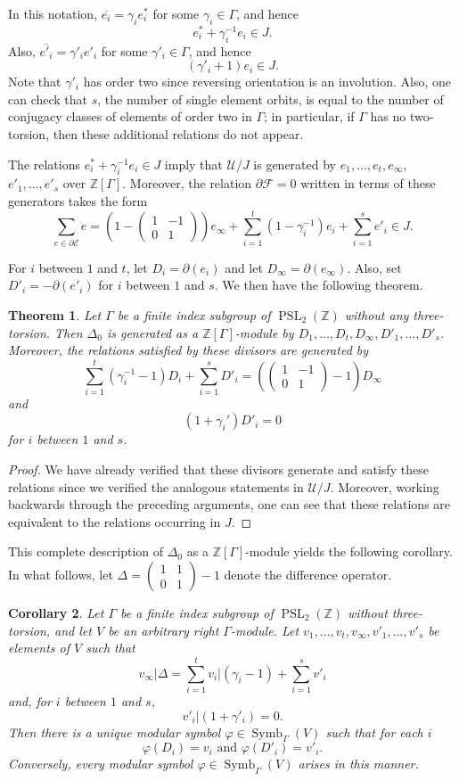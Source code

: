 \documentclass{amsart}
\theoremstyle{plain}
\newtheorem{thm}{Theorem}[section]
\newtheorem{cor}[thm]{Corollary}
\theoremstyle{definition}
\newcommand{\E}{{\mathcal E}}
\newcommand{\F}{{\mathcal F}}
\newcommand{\U}{{\mathcal U}}
\newcommand{\Z}{{\mathbb Z}}
\newcommand{\psmallmat}[4]{\left( \begin{smallmatrix} #1 & #2 \\ #3 & #4 \end{smallmatrix} \right)}
\DeclareMathOperator{\PSL}{PSL}
\DeclareMathOperator{\Symb}{Symb}
\newcommand{\MS}[1]{\Symb_{\Gamma}(#1)}
\begin{document}
In this notation, $\overline{e_i} = \gamma_i e^*_i$ for some $\gamma_i
\in \Gamma$, and hence $$e^*_i + \gamma_i^{-1} e_i \in J.$$  Also,
$\overline{e'_i} = \gamma'_i e'_i$ for some $\gamma'_i \in \Gamma$, and hence
$$
(\gamma'_i + 1) e_i \in J.
$$
Note that $\gamma'_i$ has order two since reversing orientation is an involution.  Also, one can check that $s$, the number of single element orbits, is equal to the number of conjugacy classes of elements of order two in $\Gamma$; in particular, if $\Gamma$ has no two-torsion, then
these additional relations do not appear.

The relations $e^*_i + \gamma_i^{-1} e_i \in J$ imply that $\U
/ J$ is generated by $e_1, \dots, e_t, e_\infty$, $e'_1, \dots,
e'_s$ over $\Z[\Gamma]$.  Moreover, the relation $\partial \F = 0$ written in terms of these generators takes the form
$$
\sum_{e \in \partial \E} e = \left(1 -
\psmallmat{1}{-1}{0}{1}\right) e_\infty + \sum_{i=1}^t
(1-\gamma_i^{-1}) e_i + \sum_{i=1}^s e'_i \in J.
$$

For $i$ between $1$ and $t$, let $D_i = \partial(e_i)$ and let $D_\infty = \partial(e_\infty)$. Also, set $D'_i = -\partial(e'_i)$ for $i$ between $1$ and $s$.  We then have the following theorem.

\begin{thm}
\label{thm:gen} Let $\Gamma$ be a finite index subgroup of
$\PSL_2(\Z)$ without any three-torsion.  Then $\Delta_0$ is
generated as a $\Z[\Gamma]$-module by $D_1,\dots,D_t,D_\infty,
D'_1,\dots,D'_s$. Moreover, the relations satisfied by these
divisors are generated by
$$
\sum_{i=1}^t (\gamma_i^{-1}-1) D_i + \sum_{i=1}^s D'_i= \left
(\psmallmat{1}{-1}{0}{1} - 1\right) D_\infty
$$
and
$$
(1 + \gamma_i') D'_i = 0
$$
for $i$ between $1$ and $s$.
\end{thm}

\begin{proof}
We have already verified that these divisors generate and satisfy
these relations since we verified the analogous statements in
$\U / J$.  Moreover, working backwards through the preceding
arguments, one can see that these relations are equivalent to the
relations occurring in $J$.
\end{proof}

This complete description of $\Delta_0$ as a $\Z[\Gamma]$-module yields the following corollary.  In what follows, let $\Delta = \psmallmat{1}{1}{0}{1} - 1$ denote the difference operator.

\begin{cor}
\label{cor:ms} Let $\Gamma$ be a finite index subgroup of
$\PSL_2(\Z)$ without three-torsion, and let $V$ be an arbitrary
right $\Gamma$-module.  Let $v_1,\dots,v_t, v_\infty, v'_1,\dots, v'_s$ be elements of $ V$ such that
$$
v_\infty\big| \Delta = \sum_{i=1}^t v_i\big| (\gamma_i-1) +
\sum_{i=1}^s v'_i
$$
and, for $i$ between $1$ and $s$,
$$
v'_i\big| (1+ \gamma'_i) = 0.
$$
Then there is a unique modular symbol $\varphi \in
\MS{V}$ such that for each $i$
$$
\varphi(D_i) = v_i \text{~and~}\varphi(D'_i) = v'_i.
$$
Conversely, every modular symbol $\varphi \in \MS{V}$ arises in
this manner.
\end{cor}
\end{document}
